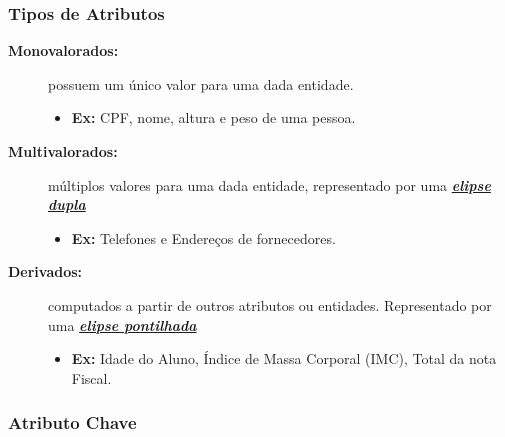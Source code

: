 \documentclass[12pt,a4paper]{article}
\begin{document}
\subsubsection{Tipos de Atributos}
\begin{description}
    \item[\textbf{Monovalorados:}]
        possuem um único valor para uma dada entidade.
        \begin{itemize}\item \textbf{Ex:} CPF, nome, altura e peso de uma pessoa.\end{itemize}
    \item[\textbf{Multivalorados:}]
        múltiplos valores para uma dada entidade, representado por uma \textit{\textbf{\underline{elipse dupla}}}
        \begin{itemize}
            \item \textbf{Ex:} Telefones e Endereços de fornecedores.
        \end{itemize}
    \item[\textbf{Derivados:}] computados a partir de outros atributos ou entidades. Representado por uma \textbf{\textit{\underline{elipse pontilhada}}}
        \begin{itemize}
            \item \textbf{Ex:} Idade do Aluno, Índice de Massa Corporal (IMC), Total da nota Fiscal.
        \end{itemize}
\end{description}

\newpage %

\subsubsection{Atributo Chave}
\end{document}
